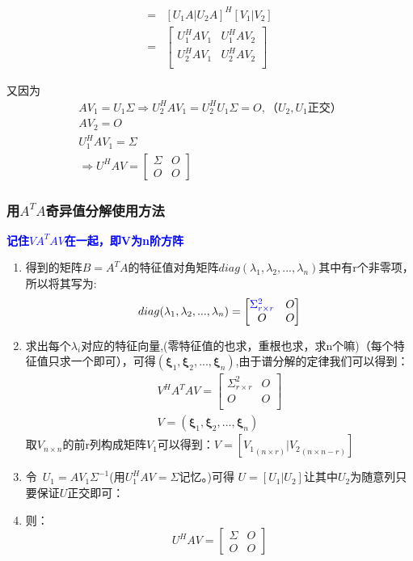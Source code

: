\documentclass[12pt]{article}
\begin{document}
\begin{CJK*}{UTF8}{gbsn}
\begin{enumerate}
\begin{align*}
		=&[U_1A|U_2A]^H[V_1|V_2]\\
		=&\begin{bmatrix}
	U_1^HAV_1&U_1^HAV_2  \\
	U_2^HAV_1&U_2^HAV_2  \\
\end{bmatrix}
	\end{align*}
\end{enumerate}
又因为
\begin{align*}
	AV_1=U_1\Sigma \Rightarrow U_2^HAV_1=U_2^HU_1\Sigma=O,\mbox{（$U_2,U_1$正交）}\\
	AV_2=O\\
	U_1^HAV_1=\Sigma\\
	\Rightarrow U^HAV=\begin{bmatrix}
	\Sigma &O  \\
	O&  O
\end{bmatrix}
\end{align*}
\subsubsection{用$A^TA$奇异值分解使用方法}
\textbf{\textcolor{blue}{记住$VA^TAV$在一起，即V为n阶方阵}}
\begin{enumerate}
	\item 得到的矩阵$B=A^TA$的特征值对角矩阵$diag(\lambda_1,\lambda_2,...,\lambda_n)$其中有r个非零项，所以将其写为:
	\begin{equation}
		diag(\lambda_1,\lambda_2,...,\lambda_n)=\begin{bmatrix}
	\textcolor{blue}{\Sigma^2_{r\times r}} &O  \\
	O&  O\\
\end{bmatrix}
	\end{equation}
	\item 求出每个$\lambda_i$对应的特征向量,(零特征值的也求，重根也求，求n个嘛)（每个特征值只求一个即可），可得$(\bm\xi_1,\bm\xi_2,...,\bm\xi_n)$,由于谱分解的定律我们可以得到：
	\begin{eqnarray*}
		V^HA^TAV=\begin{bmatrix}
	\Sigma^2_{r\times r} &O  \\
	O&  O\\
\end{bmatrix}\\
V=(\bm\xi_1,\bm\xi_2,...,\bm\xi_n)
	\end{eqnarray*}
	取$V_{n\times n}$的前r列构成矩阵$V_1$可以得到：$V=[{V_1}_{(n\times r)}|{V_2}_{(n\times n-r)}]$\\
	\item 令~$U_1=AV_1\Sigma^{-1}$(用$U_1^HAV=\Sigma$记忆。)可得
	$U=[U_1|U_2]$让其中$U_2$为随意列只要保证$U$正交即可：
	\item 则：
	\begin{equation}
		U^HAV=\begin{bmatrix}
	\Sigma &O  \\
	O&  O
\end{bmatrix}
	\end{equation}
\end{enumerate}

\end{CJK*}
\end{document}
